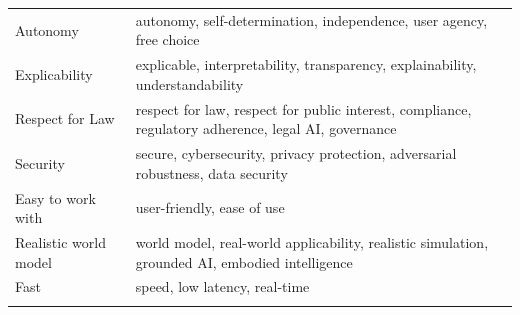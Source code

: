 \documentclass{article}
\begin{document}
\begin{longtable}{|p{5cm}|p{10cm}|}
    Autonomy & autonomy, self-determination, independence, user agency, free choice \\ 
    Explicability & explicable, interpretability, transparency, explainability, understandability \\ 
    Respect for Law & respect for law, respect for public interest, compliance, regulatory adherence, legal AI, governance \\ 
    Security & secure, cybersecurity, privacy protection, adversarial robustness, data security \\ 
    Easy to work with & user-friendly, ease of use \\ 
    Realistic world model & world model, real-world applicability, realistic simulation, grounded AI, embodied intelligence \\ 
    Fast & speed, low latency, real-time \\ 
    \hline
    \label{tab:keyword_table}
\end{longtable}
\end{document}

